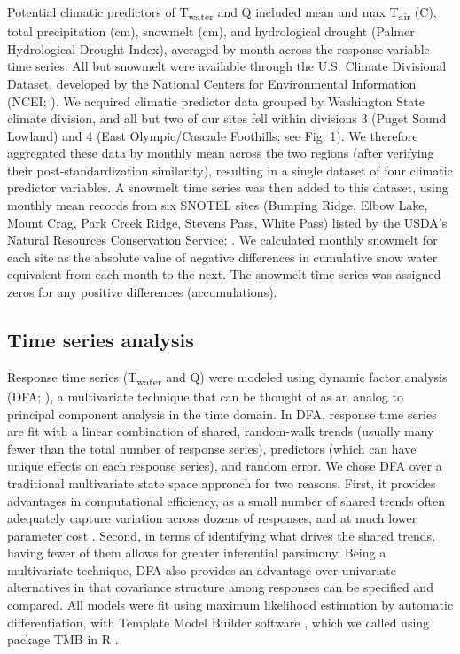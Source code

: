 \documentclass[notitlepage]{article}
\begin{document}
Potential climatic predictors of T\textsubscript{water} and Q included mean and max T\textsubscript{air} (\degree C), total precipitation (cm), snowmelt (cm), and hydrological drought (Palmer Hydrological Drought Index), averaged by month across the response variable time series. All but snowmelt were available through the U.S. Climate Divisional Dataset, developed by the National Centers for Environmental Information (NCEI; \citealt{climateData}). We acquired climatic predictor data grouped by Washington State climate division, and all but two of our sites fell within divisions 3 (Puget Sound Lowland) and 4 (East Olympic/Cascade Foothills; see Fig. 1). We therefore aggregated these data by monthly mean across the two regions (after verifying their post-standardization similarity), resulting in a single dataset of four climatic predictor variables. A snowmelt time series was then added to this dataset, using monthly mean records from six SNOTEL sites (Bumping Ridge, Elbow Lake, Mount Crag, Park Creek Ridge, Stevens Pass, White Pass) listed by the USDA's Natural Resources Conservation Service; \citealt{snowData}. We calculated monthly snowmelt for each site as the absolute value of negative differences in cumulative snow water equivalent from each month to the next. The snowmelt time series was assigned zeros for any positive differences (accumulations).


\subsection*{Time series analysis}
Response time series (T\textsubscript{water} and Q) were modeled using dynamic factor analysis (DFA; \citealt{zuur2003estimating}), a multivariate technique that can be thought of as an analog to principal component analysis in the time domain. In DFA, response time series are fit with a linear combination of shared, random-walk trends (usually many fewer than the total number of response series), predictors (which can have unique effects on each response series), and random error. We chose DFA over a traditional multivariate state space approach for two reasons. First, it provides advantages in computational efficiency, as a small number of shared trends often adequately capture variation across dozens of responses, and at much lower parameter cost \citep{zuur2003dynamic}. Second, in terms of identifying what drives the shared trends, having fewer of them allows for greater inferential parsimony. Being a multivariate technique, DFA also provides an advantage over univariate alternatives in that covariance structure among responses can be specified and compared. All models were fit using maximum likelihood estimation by automatic differentiation, with Template Model Builder software \citep{kristensen2015tmb}, which we called using package TMB in R \citep{Rmanual,tmbPackage}.
\end{document}
